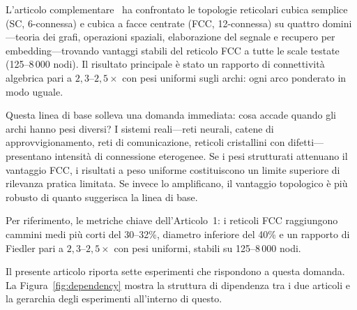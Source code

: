\documentclass[11pt]{article}
\begin{document}
L'articolo complementare~\cite{bielec2026shape} ha confrontato le
topologie reticolari cubica semplice (SC, 6-connessa) e cubica a facce
centrate (FCC, 12-connessa) su quattro domini---teoria dei grafi,
operazioni spaziali, elaborazione del segnale e recupero per
embedding---trovando vantaggi stabili del reticolo FCC a tutte le
scale testate (125--8\,000 nodi). Il risultato principale \`e stato un
rapporto di connettivit\`a algebrica pari a $2{,}3$--$2{,}5\times$ con
pesi uniformi sugli archi: ogni arco ponderato in modo uguale.

Questa linea di base solleva una domanda immediata: cosa accade quando
gli archi hanno pesi diversi? I sistemi reali---reti neurali, catene
di approvvigionamento, reti di comunicazione, reticoli cristallini con
difetti---presentano intensit\`a di connessione eterogenee. Se i pesi
strutturati attenuano il vantaggio FCC, i risultati a peso uniforme
costituiscono un limite superiore di rilevanza pratica limitata. Se
invece lo amplificano, il vantaggio topologico \`e pi\`u robusto di
quanto suggerisca la linea di base.

Per riferimento, le metriche chiave dell'Articolo~1: i reticoli FCC
raggiungono cammini medi pi\`u corti del 30--32\%, diametro inferiore
del 40\% e un rapporto di Fiedler pari a $2{,}3$--$2{,}5\times$ con
pesi uniformi, stabili su 125--8\,000 nodi.

Il presente articolo riporta sette esperimenti che rispondono a questa
domanda. La Figura~\ref{fig:dependency} mostra la struttura di
dipendenza tra i due articoli e la gerarchia degli esperimenti
all'interno di questo.
\end{document}
